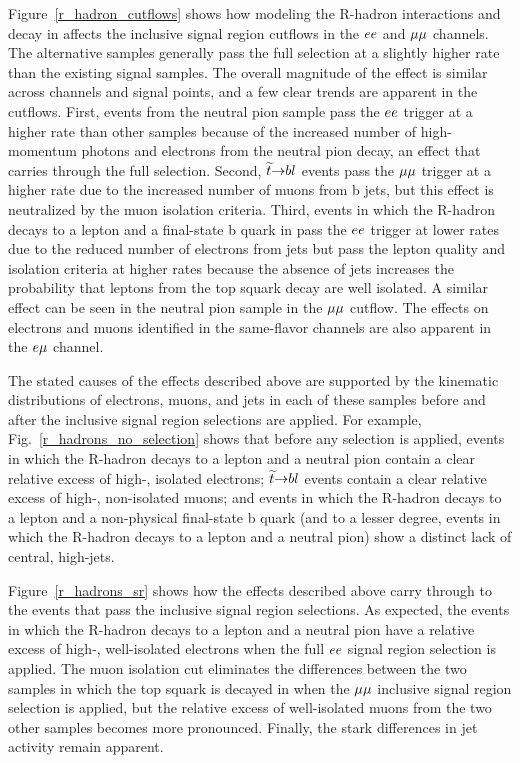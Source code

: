 Figure~\ref{r_hadron_cutflows} shows how modeling the R-hadron interactions and decay in \GEANTfour affects the inclusive signal region cutflows in the $ee$ and ${\mu}{\mu}$ channels. The alternative samples generally pass the full selection at a slightly higher rate than the existing signal samples. The overall magnitude of the effect is similar across channels and signal points, and a few clear trends are apparent in the cutflows. First, events from the neutral pion sample pass the $ee$ trigger at a higher rate than other samples because of the increased number of high-momentum photons and electrons from the neutral pion decay, an effect that carries through the full selection. Second, $\widetilde{t} {\to} b l$ events pass the ${\mu}{\mu}$ trigger at a higher rate due to the increased number of muons from b jets, but this effect is neutralized by the muon isolation criteria. Third, events in which the R-hadron decays to a lepton and a final-state b quark in \GEANTfour pass the $ee$ trigger at lower rates due to the reduced number of electrons from jets but pass the lepton quality and isolation criteria at higher rates because the absence of jets increases the probability that leptons from the top squark decay are well isolated. A similar effect can be seen in the neutral pion sample in the ${\mu}{\mu}$ cutflow. The effects on electrons and muons identified in the same-flavor channels are also apparent in the $e{\mu}$ channel.



The stated causes of the effects described above are supported by the kinematic distributions of electrons, muons, and jets in each of these samples before and after the inclusive signal region selections are applied. For example, Fig.~\ref{r_hadrons_no_selection} shows that before any selection is applied, events in which the R-hadron decays to a lepton and a neutral pion contain a clear relative excess of high-\pt, isolated electrons; $\widetilde{t} {\to} b l$ events contain a clear relative excess of high-\pt, non-isolated muons; and events in which the R-hadron decays to a lepton and a non-physical final-state b quark (and to a lesser degree, events in which the R-hadron decays to a lepton and a neutral pion) show a distinct lack of central, high-\pt jets.



Figure~\ref{r_hadrons_sr} shows how the effects described above carry through to the events that pass the inclusive signal region selections. As expected, the events in which the R-hadron decays to a lepton and a neutral pion have a relative excess of high-\pt, well-isolated electrons when the full $ee$ signal region selection is applied. The muon isolation cut eliminates the differences between the two samples in which the top squark is decayed in \PYTHIA when the ${\mu}{\mu}$ inclusive signal region selection is applied, but the relative excess of well-isolated muons from the two other samples becomes more pronounced. Finally, the stark differences in jet activity remain apparent.

